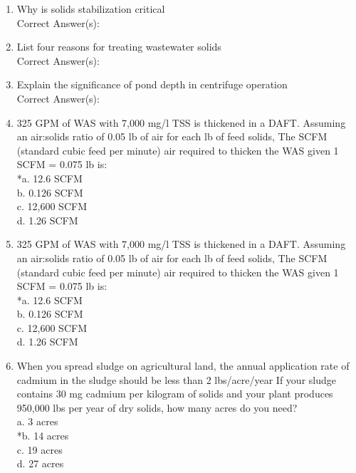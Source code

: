 \documentclass{article}
\begin{document}
\begin{enumerate}
\item  Why is solids stabilization critical \\

Correct Answer(s): \\

\item  List four reasons for treating wastewater solids \\

Correct Answer(s): \\

\item  Explain the significance of pond depth in centrifuge operation \\

Correct Answer(s): \\

\item  325 GPM of WAS with 7,000 mg/l TSS is thickened in a DAFT. Assuming an air:solids ratio of 0.05 lb of air for each lb of feed solids, The SCFM (standard cubic feed per minute) air required to thicken the WAS given 1 SCFM = 0.075 lb is: \\

*a. 12.6 SCFM \\
b. 0.126 SCFM \\
c. 12,600 SCFM \\
d. 1.26 SCFM \\

\item  325 GPM of WAS with 7,000 mg/l TSS is thickened in a DAFT. Assuming an air:solids ratio of 0.05 lb of air for each lb of feed solids, The SCFM (standard cubic feed per minute) air required to thicken the WAS given 1 SCFM = 0.075 lb is: \\

*a. 12.6 SCFM \\
b. 0.126 SCFM \\
c. 12,600 SCFM \\
d. 1.26 SCFM \\

\item  When you spread sludge on agricultural land, the annual application rate of cadmium in the sludge should be less than 2 lbs/acre/year If your sludge contains 30 mg cadmium per kilogram of solids and your plant produces 950,000 lbs per year of dry solids, how many acres do you need? \\

a. 3 acres \\
*b. 14 acres \\
c. 19 acres \\
d. 27 acres \\


\end{enumerate}
\end{document}
